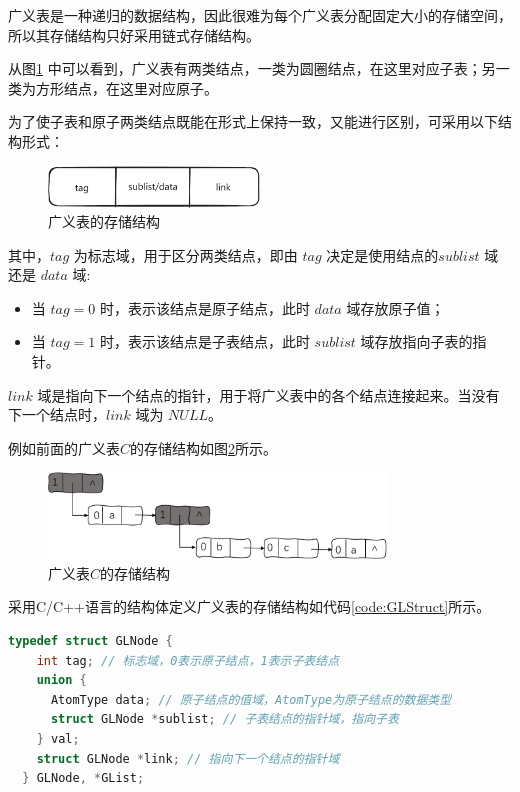 \documentclass[lang=cn,newtx,10pt,scheme=chinese]{elegantbook}
\begin{document}
广义表是一种递归的数据结构，因此很难为每个广义表分配固定大小的存储空间，所以其存储结构只好采用链式存储结构。

从图\ref{fig:generalized_table_node} 中可以看到，广义表有两类结点，一类为圆圈结点，在这里对应子表；另一类为方形结点，在这里对应原子。

为了使子表和原子两类结点既能在形式上保持一致，又能进行区别，可采用以下结构形式：

\begin{figure}[h]
  \centering
  \includegraphics[width=0.5\textwidth]{./figure/pdf/cropped/GLStruct.pdf}
  \caption{广义表的存储结构}
  \label{fig:generalized_table_node}
\end{figure}

其中，$tag$ 为标志域，用于区分两类结点，即由 $tag$ 决定是使用结点的$sublist$ 域还是 $data$ 域:

\begin{itemize}
  \item 当 $tag = 0$ 时，表示该结点是原子结点，此时 $data$ 域存放原子值；
  \item 当 $tag = 1$ 时，表示该结点是子表结点，此时 $sublist$ 域存放指向子表的指针。
  \end{itemize}

  $link$ 域是指向下一个结点的指针，用于将广义表中的各个结点连接起来。当没有下一个结点时，$link$ 域为 $NULL$。

  例如前面的广义表$C$的存储结构如图\ref{fig:GLStructGraph}所示。

  \begin{figure}[h!]
    \centering
    \includegraphics[width=0.8\textwidth]{./figure/pdf/cropped/GLStructGraph.pdf}
    \caption{广义表$C$的存储结构}
    \label{fig:GLStructGraph}
  \end{figure}


  采用C/C++语言的结构体定义广义表的存储结构如代码\ref{code:GLStruct}所示。

  \begin{lstlisting}[language=C++, caption={广义表的存储结构}, label={code:GLStruct}]
  typedef struct GLNode {
    int tag; // 标志域，0表示原子结点，1表示子表结点
    union {
      AtomType data; // 原子结点的值域，AtomType为原子结点的数据类型
      struct GLNode *sublist; // 子表结点的指针域，指向子表
    } val;
    struct GLNode *link; // 指向下一个结点的指针域
  } GLNode, *GList;
  \end{lstlisting}
\end{document}
